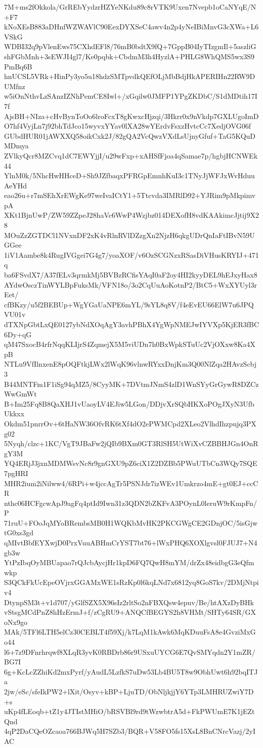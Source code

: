 7M+ms2fOkkola/GrREbYydzrHZYeNKdu89c8rVTK9Uxen7Nvepb1oCaNYqE/N+F7
kNoXEsB883aDHnfWZWAVlC90EexDYXSeC4awv4n2p4yNeIBiMnvG3cXWa+L6VSkG
WDBI32q9pVlenEws75CXhdEFl8/76mB0bdtX9fQ+7GppB04IyTIzgmIl+5aszliG
shFGbMnh+3sEWJI4gl7/Ke0pqbk+CbdmM3h4HyzlA+PHLG8WhQMS5wx3S9PmBq6B
hnUCSL5VRk+HinPy3yo5u18hdzSMTpvdkQEfOLjMbBdjHkAPERIHn22RW9DUMfnz
w5iOnNthvLzSAnzIZNhPemCE8Iwl+/xGqilw0JMFP1YPgZKDbC/S1dMDtih17I7f
AjsBH+NIza+cHvBynToOo6lroFcxT8gKwxcHjzqi/3Hkrr0x9nVkdp7GXLUgoImD
O7hf4VyjLn7j92bhTdJco15wyvxYYav0lXA28wYErdvFsxzHvtcCc7XedjOVG06f
GUbdHUR01jAWXXQ58oikCxk2J/82gQA2VcQwzVXdLsUjnyGfuf+TaG5KQuDMDmya
ZVlkyQcr8MZCvq1dC7EWYjjI/u29wFxp+xAHSfFjoa4qSamae7p/hgbjHCNWEk44
YlnM0k/5NhcHwHHceD+Sh9JZfbaqxPFRGpEmnhKuI3c1TNyJjWFJxWvHduuAeYHd
eao26u+r7mSEhXrEWgKe97weIvaICtY1+5Ttcvda3IMRlD92+YJRim9pMkpimvpA
XKt1BjnUwP/ZW59ZZpeJ28haVc6WwP4Wzjbz014DEXofH8vdKAAkimcJjtij9X28
MOuZzZGTDCl1NVxnDF2xK4vRlnRVlDZzgXn2NjzH6qkgUDrQnIaFtIBvN59UGGee
1iV1Aambe8k4RugIVGgei7G4g7/yoaXOF/v6OzSCGNzxRSasDiVHusKRYIJ+471q
ba6FSvdX7/A37fELv3qrmkMj5BVBzRCfisYAqI0aF2oy4HI2kyyDEL9hEJxyHax8
AYdwOsczTinWYLBpFuksMk/VFN18o/3o2CqUuAoKotnP2/BtC5+WxXYUyl3rEet/
cfBKzy/u5f2BEBUp+WgYGaUaNPE6mYL/9sYL8q8V/f4eEvEU66ElW7u6JPQVU01v
dTXNpGbtLxQE0127ybNdXOqAgY3avhPBhX4YgWpNMEJwIYVXp5KjER3fBC6Dy+qG
qM47SxocB4rfrNqqKLIjrS4ZqmejX5M5viUDn7h0BxWpkSTuUc2VjOXxw8Ka4XpB
NTLu9VfIlnxenE8pOQFtkjLWx2lWqK96vlnwRYxxDnjKm3Q00NlZqa2HAvzScbj3
B44MNTFm1F1iSg94qMZ5/8CyyMK+7DVtmJNmS4zlD1WnSYyGrGywR8DZCzWwGmWt
B+Im25Fq8B8QaXHJ1vUaoyLV4EJiw5LGon/DDjvXrSQbHKXoPOgJXyN3UfbUkkxx
Okdm51pnrrOv+6tHaNW36OfvRK6tXf4dO2ePWMCpd2XLeo2VlhdIhzpujq3PXg02
5Nyqh/clzc+1KC/VgT9JBaFw2jQIb9BXm0GT3RlSH5UtWiXvCZBBHJGn4OnRgY3M
YQ4ERjJ3jxnMDMWsvNc8r9gnGXU9pZ6ciX1Z2DZBb5PWuUTbCn3WQy7SQE7pgHRI
MHR2ium2iNilww4/6RPi+w4jccAgTr5PSNJdr7izWEv1Umkrzo4mE+gt0EJ+ccCR
nthc06HCFgcwApJ9agFq4ptId9Iwn31z3QDN2bZKFvA3POynL0leruW9rKmpFn/P
71ruU+FOoJqMYoBRembsMB0H1WQKbMvHK2PKCGWgCE2GDnjOC/5isGjwtG0xs3gd
qMIvtBbfEYXwjD0PrxVuuABHmCrYST7bt76+lWxPHQ6XOXlgvsl0FJUJ7+N4gb3w
YtPzIbqOyMBUapao7rQJcbAycjHr1kpD6FQ7QwH8mYM/drZx48eidbgG3eQfmwkp
S3QCkFkUcEpeOVjrxGGAMxWE1sRzKp0l6kqLNd7x6812yq8GoS7kv/2DMjNtpiv4
DtynpSM3t+v1d707/yGlfSZX5X96sIz2rltSo2nFBXQsw4epuv/Be/htAXzDyBHk
vStsgMCdPnZ8hHzErmJ+f/zCgRU9+ANQCfBEGYS2h8VHMt/SHTy64SR/GXoNx9go
MAk/5TFl6LTH5elCz30CEBLT4f59Xj/k7LqM1kAwk6MqKDuuFsA8e4GvziMxGo44
l6+7z9DFnrhrqwf8XLqR3yvK0RBDrb86r9USxuUYCG6E7QvSMYqdn2Y1mZR/BG7I
6g+KcLcZZhiKd2mxPyrf/yAudL5LzfkS7uDw53Lb4BU5T8w9ObhUwt6h92bqITJa
2jw/eSc/sfeIkPW2+lXit/Osyv+kBP+LjuTD/ObNljkjjY6YTp3LMHRUZwiY7D+s
uKp4fLEoqb+tZ1y4JTIstMHiO/bRSVBl9rd9tWzwbtrA5d+FkPWUmE7K1jEZtQnd
4qP2DaCQeOZcaoa766BJWq5H7SZb3/BQR+V58FO5fs15XsL8BnCNrcVazj/2yIAC
